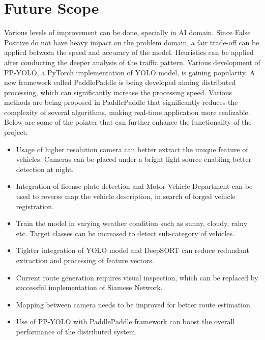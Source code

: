 \section{Future Scope}
Various levels of improvement can be done, specially in AI domain. Since False Positive do not have heavy impact on the problem domain, a fair trade-off can be applied between the speed and accuracy of the model. Heuristics can be applied after conducting the deeper analysis of the traffic pattern. Various development of PP-YOLO, a PyTorch implementation of YOLO model, is gaining popularity. A new framework called PaddlePaddle \cite{paddlepaddle} is being developed aiming distributed processing, which can significantly increase the processing speed. Various methods are being proposed in PaddlePaddle that significantly reduces the complexity of several algorithms, making real-time application more realizable. Below are some of the pointer that can further enhance the functionality of the project:
\begin{itemize}
	\item Usage of higher resolution camera can better extract the unique feature of vehicles. Cameras can be placed under a bright light source enabling better detection at night.
	\item Integration of license plate detection and Motor Vehicle Department can be used to reverse map the vehicle description, in search of forged vehicle registration.
	\item Train the model in varying weather condition such as sunny, cloudy, rainy etc. Target classes can be increased to detect sub-category of vehicles.
	\item Tighter integration of YOLO model and DeepSORT can reduce redundant extraction and processing of feature vectors.
	\item Current route generation requires visual inspection, which can be replaced by successful implementation of Siamese Network.
	\item Mapping between camera needs to be improved for better route estimation.
	\item Use of PP-YOLO with PaddlePaddle framework can boost the overall performance of the distributed system.
\end{itemize}